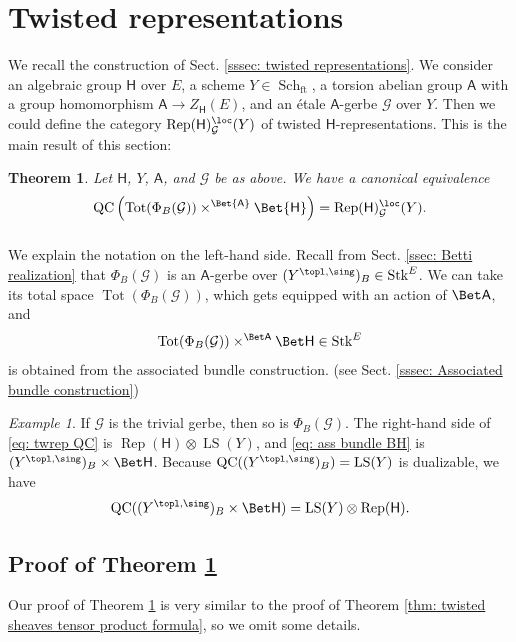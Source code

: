 \documentclass[10pt]{amsart}
\newcommand{\sssec}{\subsubsection}
\newtheorem{thm}[subsubsection]{Theorem}
\theoremstyle{remark}
\newtheorem{ex}[subsubsection]{Example}
\newcommand{\on}{\operatorname}
\newcommand{\cG}{\mathcal{G}}
\newcommand{\Rep}{\on{Rep}}
\newcommand{\QC}{\on{QC}}
\newcommand{\LS}{\on{LS}}
\newcommand{\Stk}{\on{Stk}}
\newcommand{\Schft}{\on{Sch}_{\on{ft}}}
\newcommand{\Tot}{\on{Tot}}
\newcommand{\sfA}{\mathsf{A}}
\begin{document}
\section{Twisted representations}\label{sec: twisted representations}
We recall the construction of Sect. \ref{sssec: twisted representations}. We consider an algebraic group $\mathsf{H}$ over $E$, a scheme $Y\in\Schft$, a torsion abelian group $\sfA$ with a group homomorphism $\sfA\rightarrow Z_\mathsf{H}(E)$, and an \'etale $\sfA$-gerbe $\cG$ over $Y$. Then we could define the category $\Rep(\mathsf{H})^{\loc}_{\cG}(Y)$ of twisted $\mathsf{H}$-representations. This is the main result of this section:
\begin{thm}\label{thm: twisted representations}
    Let $\mathsf{H}$, $Y$, $\sfA$, and $\cG$ be as above. We have a canonical equivalence
    \begin{equation}\label{eq: twrep QC}
        \QC\left(\on{Tot}(\Phi_B(\cG))\times^{\Bet{\sfA}}\Bet{\mathsf{H}}\right)=\Rep(\mathsf{H})^{\loc}_{\cG}(Y).
    \end{equation}
\end{thm}

\sssec{}
We explain the notation on the left-hand side.
Recall from Sect. \ref{ssec: Betti realization} that $\Phi_B(\cG)$ is an $\sfA$-gerbe over $(Y^{\topl,\sing})_B \in \Stk^E$. We can take its total space $\Tot(\Phi_B(\cG))$, which gets equipped with an action of $\Bet \sfA$, and 
\begin{equation}\label{eq: ass bundle BH}
    \on{Tot}(\Phi_B(\cG))\times^{\Bet \sfA}\Bet \mathsf{H}\in\Stk^E
\end{equation}
is obtained from the associated bundle construction. (see Sect. \ref{sssec: Associated bundle construction})

\begin{ex}\label{ex: equiv trivial gerbe}
    If $\cG$ is the trivial gerbe, then so is $\Phi_B(\cG)$. The right-hand side of \eqref{eq: twrep QC} is $\Rep(\mathsf{H})\otimes \LS(Y)$, and \eqref{eq: ass bundle BH} is $(Y^{\topl,\sing})_B\times \Bet \mathsf{H}$. Because $\QC((Y^{\topl,\sing})_B)=\LS(Y)$ is dualizable, we have
    \[\QC((Y^{\topl,\sing})_B\times \Bet \mathsf{H})=\LS(Y)\otimes \Rep(\mathsf{H}).\]
\end{ex}

\subsection{Proof of Theorem \ref{thm: twisted representations}}
Our proof of Theorem \ref{thm: twisted representations} is very similar to the proof of Theorem \ref{thm: twisted sheaves tensor product formula}, so we omit some details.
\end{document}
